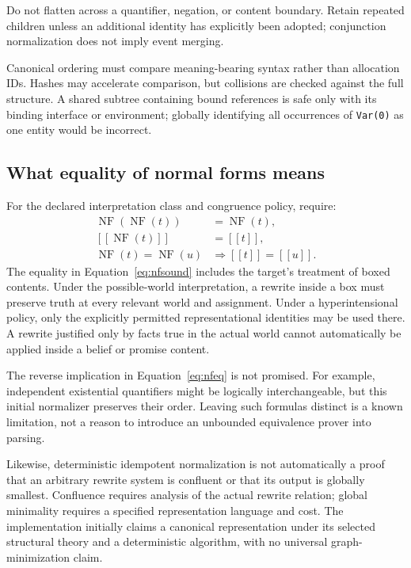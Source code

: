 \documentclass[11pt,a4paper]{article}
\newcommand{\NF}{\operatorname{NF}}
\newcommand{\sem}[1]{\left[\!\left[#1\right]\!\right]}
\newcommand{\code}[1]{\texttt{#1}}
\begin{document}
Do not flatten across a quantifier, negation, or content boundary. Retain
repeated children unless an additional identity has explicitly been adopted;
conjunction normalization does not imply event merging.

Canonical ordering must compare meaning-bearing syntax rather than
allocation IDs. Hashes may accelerate comparison, but collisions are checked
against the full structure. A shared subtree containing bound references is
safe only with its binding interface or environment; globally identifying all
occurrences of \code{Var(0)} as one entity would be incorrect.

\subsection{What equality of normal forms means}
For the declared interpretation class and congruence policy, require:
\begin{align}
 \NF(\NF(t))&=\NF(t), \label{eq:idempotence}\\
 \sem{\NF(t)}&=\sem{t}, \label{eq:nfsound}\\
 \NF(t)=\NF(u)&\Longrightarrow \sem{t}=\sem{u}. \label{eq:nfeq}
\end{align}
The equality in Equation~\eqref{eq:nfsound} includes the target's treatment of
boxed contents. Under the possible-world interpretation, a rewrite inside a
box must preserve truth at every relevant world and assignment. Under a
hyperintensional policy, only the explicitly permitted representational
identities may be used there. A rewrite justified only by facts true in the
actual world cannot automatically be applied inside a belief or promise
content.

The reverse implication in Equation~\eqref{eq:nfeq} is not promised. For
example, independent existential quantifiers might be logically
interchangeable, but this initial normalizer preserves their order. Leaving
such formulas distinct is a known limitation, not a reason to introduce an
unbounded equivalence prover into parsing.

Likewise, deterministic idempotent normalization is not automatically a
proof that an arbitrary rewrite system is confluent or that its output is
globally smallest. Confluence requires analysis of the actual rewrite
relation; global minimality requires a specified representation language and
cost. The implementation initially claims a canonical representation under
its selected structural theory and a deterministic algorithm, with no
universal graph-minimization claim.
\end{document}
